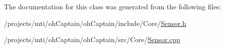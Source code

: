The documentation for this class was generated from the following files\+:\begin{DoxyCompactItemize}
\item 
/projects/mti/oh\+Captain/oh\+Captain/include/\+Core/\hyperlink{_sensor_8h}{Sensor.\+h}\item 
/projects/mti/oh\+Captain/oh\+Captain/src/\+Core/\hyperlink{_sensor_8cpp}{Sensor.\+cpp}\end{DoxyCompactItemize}
